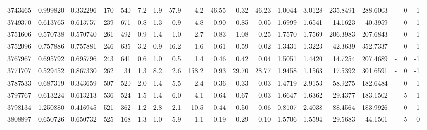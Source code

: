 \begin{tabular}{rrrrrrrrrrrrrrrrlrr}
   3743465 & 0.999820 &   0.332296 &  170 &  540 &      7.2 &      1.9 &    57.9 &      4.2 &      46.55 &        0.32 &       46.23 &  1.0044 &  3.0128 &  235.8491 &  288.6003 &             - &        0 &         -1 \\
   3749370 & 0.613765 &   0.613757 &  239 &  671 &      0.8 &      1.3 &     0.9 &      4.8 &       0.90 &        0.85 &        0.05 &  1.6999 &  1.6541 &   14.1623 &   40.3959 &             - &        0 &         -1 \\
   3751606 & 0.570738 &   0.570740 &  261 &  492 &      0.9 &      1.4 &     1.0 &      2.7 &       0.83 &        1.08 &        0.25 &  1.7570 &  1.7569 &  206.3983 &  207.6843 &             - &        0 &         -1 \\
   3752096 & 0.757886 &   0.757881 &  246 &  635 &      3.2 &      0.9 &    16.2 &      1.6 &       0.61 &        0.59 &        0.02 &  1.3431 &  1.3223 &   42.3639 &  352.7337 &             - &        0 &         -1 \\
   3767967 & 0.695792 &   0.695796 &  243 &  641 &      0.6 &      1.0 &     0.5 &      1.4 &       0.46 &        0.42 &        0.04 &  1.5051 &  1.4420 &   14.7254 &  207.4689 &             - &        0 &         -1 \\
   3771707 & 0.529452 &   0.867330 &  262 &   34 &      1.3 &      8.2 &     2.6 &    158.2 &       0.93 &       29.70 &       28.77 &  1.9458 &  1.1563 &   17.5392 &  301.6591 &             - &        0 &         -1 \\
   3787533 & 0.687319 &   0.343659 &  507 &  520 &      2.0 &      1.4 &     5.5 &      2.4 &       0.36 &        0.33 &        0.03 &  1.4719 &  2.9153 &   58.9275 &  182.6484 &             - &        0 &         -1 \\
   3797767 & 0.613224 &   0.613213 &  536 &  524 &      1.5 &      1.4 &     6.0 &      4.1 &       0.64 &        0.67 &        0.03 &  1.6647 &  1.6362 &   29.4377 &  183.1502 &             - &        5 &          1 \\
   3798134 & 1.250880 &   0.416945 &  521 &  362 &      1.2 &      2.8 &     2.1 &     10.5 &       0.44 &        0.50 &        0.06 &  0.8107 &  2.4038 &   88.4564 &  183.9926 &             - &        0 &         -1 \\
   3808897 & 0.650726 &   0.650732 &  525 &  168 &      1.3 &      1.0 &     5.9 &      1.1 &       0.19 &        0.29 &        0.10 &  1.5706 &  1.5594 &   29.5683 &   44.1501 &             - &        5 &          0 \\

\end{tabular}
